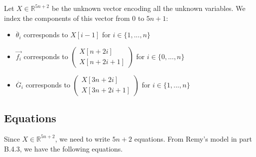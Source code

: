 \documentclass{article}
\begin{document}
Let $X \in \mathbb{R}^{5n+2}$ be the unknown vector encoding all the unknown variables. We index the components of this vector from $0$ to $5n+1$:
\begin{itemize}
  \item $\ddot{\theta_i}$ corresponds to $X[i-1]$ for $i \in \{1, ..., n\}$
  \item $\vec{f_i}$ corresponds to     
    $\begin{pmatrix}
        X[n+2i] \\
        X[n+2i+1] 
    \end{pmatrix}$ for $i \in \{0, ..., n\}$
  \item $\ddot{G_i}$ corresponds to 
    $\begin{pmatrix}
        X[3n+2i] \\
        X[3n+2i+1] 
    \end{pmatrix}$ for $i \in \{1, ..., n\}$
\end{itemize}

\subsection{Equations}
Since $X \in \mathbb{R}^{5n+2}$, we need to write $5n+2$ equations. From Remy's model in part B.4.3, we have the following equations.
\end{document}

